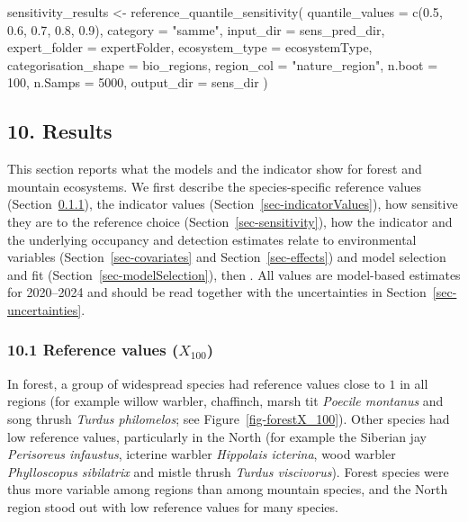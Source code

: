 \documentclass[
  letterpaper,
  DIV=11,
  numbers=noendperiod]{scrartcl}
\newenvironment{Shaded}{\begin{snugshade}}{\end{snugshade}}
\newcommand{\AttributeTok}[1]{\textcolor[rgb]{0.40,0.45,0.13}{#1}}
\newcommand{\DecValTok}[1]{\textcolor[rgb]{0.68,0.00,0.00}{#1}}
\newcommand{\FloatTok}[1]{\textcolor[rgb]{0.68,0.00,0.00}{#1}}
\newcommand{\FunctionTok}[1]{\textcolor[rgb]{0.28,0.35,0.67}{#1}}
\newcommand{\NormalTok}[1]{\textcolor[rgb]{0.00,0.23,0.31}{#1}}
\newcommand{\OtherTok}[1]{\textcolor[rgb]{0.00,0.23,0.31}{#1}}
\newcommand{\StringTok}[1]{\textcolor[rgb]{0.13,0.47,0.30}{#1}}
\begin{document}
\begin{Shaded}
\begin{Highlighting}[]
\NormalTok{sensitivity\_results }\OtherTok{\textless{}{-}} \FunctionTok{reference\_quantile\_sensitivity}\NormalTok{(}
  \AttributeTok{quantile\_values =} \FunctionTok{c}\NormalTok{(}\FloatTok{0.5}\NormalTok{, }\FloatTok{0.6}\NormalTok{, }\FloatTok{0.7}\NormalTok{, }\FloatTok{0.8}\NormalTok{, }\FloatTok{0.9}\NormalTok{),}
  \AttributeTok{category =} \StringTok{"samme"}\NormalTok{,}
  \AttributeTok{input\_dir =}\NormalTok{ sens\_pred\_dir,}
  \AttributeTok{expert\_folder =}\NormalTok{ expertFolder,}
  \AttributeTok{ecosystem\_type =}\NormalTok{ ecosystemType,}
  \AttributeTok{categorisation\_shape =}\NormalTok{ bio\_regions,}
  \AttributeTok{region\_col =} \StringTok{"nature\_region"}\NormalTok{,}
  \AttributeTok{n.boot =} \DecValTok{100}\NormalTok{,}
  \AttributeTok{n.Samps =} \DecValTok{5000}\NormalTok{,}
  \AttributeTok{output\_dir =}\NormalTok{ sens\_dir}
\NormalTok{)}
\end{Highlighting}
\end{Shaded}

\subsection{10. Results}\label{results}

This section reports what the models and the indicator show for forest
and mountain ecosystems. We first describe the species-specific
reference values (Section~\ref{sec-refValues}), the indicator values
(Section~\ref{sec-indicatorValues}), how sensitive they are to the
reference choice (Section~\ref{sec-sensitivity}), how the indicator and
the underlying occupancy and detection estimates relate to environmental
variables (Section~\ref{sec-covariates} and Section~\ref{sec-effects})
and model selection and fit (Section~\ref{sec-modelSelection}), then .
All values are model-based estimates for 2020--2024 and should be read
together with the uncertainties in Section~\ref{sec-uncertainties}.

\subsubsection{\texorpdfstring{10.1 Reference values
(\(X_{100}\))}{10.1 Reference values (X\_\{100\})}}\label{sec-refValues}

In forest, a group of widespread species had reference values close to
\(1\) in all regions (for example willow warbler, chaffinch, marsh tit
\emph{Poecile montanus} and song thrush \emph{Turdus philomelos}; see
Figure~\ref{fig-forestX_100}). Other species had low reference values,
particularly in the North (for example the Siberian jay \emph{Perisoreus
infaustus}, icterine warbler \emph{Hippolais icterina}, wood warbler
\emph{Phylloscopus sibilatrix} and mistle thrush \emph{Turdus
viscivorus}). Forest species were thus more variable among regions than
among mountain species, and the North region stood out with low
reference values for many species.
\end{document}

